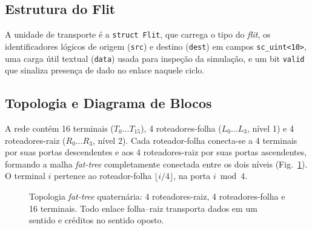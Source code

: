 \documentclass[conference]{IEEEtran}
\begin{document}
\subsection{Estrutura do Flit}
A unidade de transporte é a \texttt{struct Flit}, que carrega o tipo do
\emph{flit}, os identificadores lógicos de origem (\texttt{src}) e destino
(\texttt{dest}) em campos \texttt{sc\_uint<10>}, uma carga útil textual
(\texttt{data}) usada para inspeção da simulação, e um bit \texttt{valid} que
sinaliza presença de dado no enlace naquele ciclo.

\subsection{Topologia e Diagrama de Blocos}
A rede contém 16 terminais ($T_0 \ldots T_{15}$), 4 roteadores-folha
($L_0 \ldots L_3$, nível 1) e 4 roteadores-raiz ($R_0 \ldots R_3$, nível 2).
Cada roteador-folha conecta-se a 4 terminais por suas portas descendentes e aos
4 roteadores-raiz por suas portas ascendentes, formando a malha
\emph{fat-tree} completamente conectada entre os dois níveis
(Fig.~\ref{fig:topologia}). O terminal $i$ pertence ao roteador-folha
$\lfloor i/4 \rfloor$, na porta $i \bmod 4$.

\begin{figure}[!t]
\centering
{}
\caption{Topologia \emph{fat-tree} quaternária: 4 roteadores-raiz, 4
roteadores-folha e 16 terminais. Todo enlace folha--raiz transporta dados em um
sentido e créditos no sentido oposto.}
\label{fig:topologia}
\end{figure}
\end{document}
